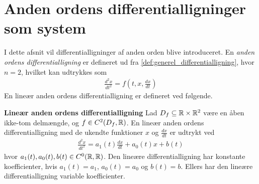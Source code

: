 \section{Anden ordens differentialligninger som system}

I dette afsnit vil differentialligninger af anden orden blive introduceret. En \textit{anden ordens differentialligning} er defineret ud fra \autoref{def:generel_differentialligning}, hvor $n=2$, hvilket kan udtrykkes som
\begin{align*}
    \frac{d^2x}{dt^2} = f\left(t, x, \frac{dx}{dt}\right)
\end{align*}
En lineær anden ordens differentialligning er defineret ved følgende. 
\begin{defn}\textbf{Lineær anden ordens differentialligning} %
\newline
Lad $D_f \subseteq \mathbb{R} \times \mathbb{R}^2$ være en åben ikke-tom delmængde, og $f\in C^2(D_f, \mathbb{R})$. En lineær anden ordens differentialligning med de ukendte funktioner $x$ og $\frac{dx}{dt}$ er udtrykt ved
\begin{align*}
    \frac{d^2x}{dt^2}=a_1(t)\frac{dx}{dt}+a_0(t)x + b(t)
\end{align*}
hvor $a_1(t), a_0(t), b(t) \in C^0(\mathbb{R},\mathbb{R})$. Den lineære differentialligning har konstante koefficienter, hvis $a_1(t)=a_1$, $a_0(t)=a_0$ og $b(t)=b$. Ellers har den lineære differentialligning variable koefficienter.
\end{defn}



